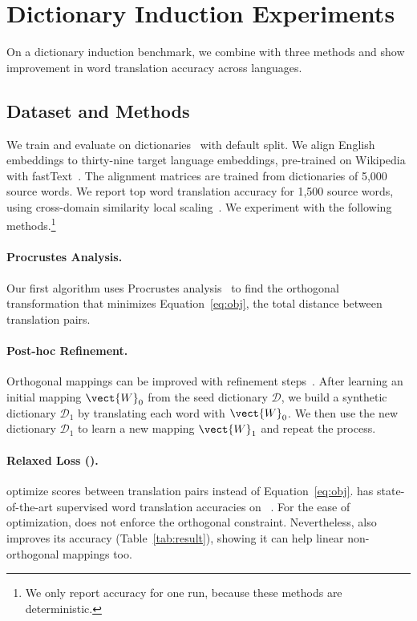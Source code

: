 \section{Dictionary Induction Experiments}\label{sec:exp}

On a dictionary induction benchmark, we combine \name{} with three
 methods and show improvement in word translation accuracy across
languages.

\subsection{Dataset and Methods}

We train and evaluate  on  dictionaries~\citep{conneau-18}
with default split.
%
We align English embeddings to thirty-nine target language embeddings,
pre-trained on Wikipedia with fastText~\cite{bojanowski-17}.  The alignment
matrices are trained from dictionaries of 5,000 source words.
We report top word translation accuracy for 1,500 source words,
using cross-domain similarity local scaling~\citep[]{conneau-18}.
We experiment with the following  methods.\footnote{We only report
accuracy for one run, because these  methods are deterministic.}

\paragraph{Procrustes Analysis.}  Our first algorithm uses Procrustes
analysis~\cite{schonemann-66} to find the orthogonal transformation that
minimizes Equation~\ref{eq:obj}, the total distance between translation pairs.

\paragraph{Post-hoc Refinement.}  Orthogonal mappings can be improved
with refinement steps~\cite{artetxe-17,conneau-18}.
After learning an initial mapping $\vect{W}_0$ from the seed dictionary
$\mathcal{D}$, we build a synthetic dictionary $\mathcal{D}_1$ by translating
each word with $\vect{W}_0$.  We then use the new dictionary $\mathcal{D}_1$ to
learn a new mapping $\vect{W}_1$ and repeat the process.

\paragraph{Relaxed  Loss ().}
\citet{joulin-18} optimize  scores between translation pairs instead
of Equation~\eqref{eq:obj}. 
 has state-of-the-art supervised word translation accuracies on
~\citep{glavas-19}.
For the ease of optimization,  does not enforce the orthogonal
constraint.
%
Nevertheless, \name{} also improves its accuracy
(Table~\ref{tab:result}), showing it can help linear non-orthogonal
mappings too.

